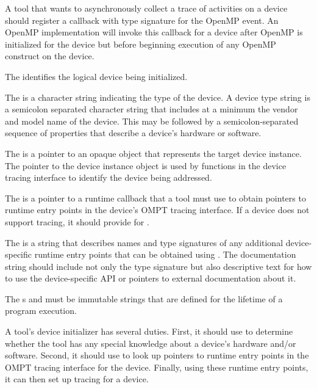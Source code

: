 A tool that wants to asynchronously collect a trace of
activities on a device should register a callback with type signature
 for the
 OpenMP event. An OpenMP
implementation will invoke this callback for a device after OpenMP is
initialized for the device but before beginning execution of any
OpenMP construct on the device.

\argdesc

The \callbackarg{}  identifies the logical device being initialized.

The \callbackarg{}  is a character string indicating the type of the
device. A device type string is a semicolon separated character string
that includes at a minimum the vendor and model name of the
device. This may be followed by a semicolon-separated sequence of
properties that describe a device's hardware or software.  

The \callbackarg{}  is a pointer to an opaque object that represents
the target device instance. The pointer to the device instance object
is used by functions in the device tracing interface to identify the
device being addressed.

The \callbackarg{}  is a pointer to a runtime callback
that a tool must use to obtain pointers to runtime entry points in the
device's OMPT tracing interface. If a device does not support tracing,
it should provide  for .

The \callbackarg{}  is a string that describes names and type signatures
of any additional device-specific runtime entry points that can be obtained
using . The documentation string should include
not only the type signature but also descriptive text for how to use
the device-specific API or pointers to external documentation about
it.

\constraints
The \callbackarg{}s  and  must be
immutable strings that are defined for the lifetime of a program
execution.

\effect

A tool's device initializer has several duties.  First, it should use
 to determine whether the tool has any special knowledge
about a device's hardware and/or software.  Second, it should use
 to look up pointers to runtime entry points in the OMPT tracing
interface for the device.  Finally, using these runtime entry points, it can
then set up tracing for a device.

